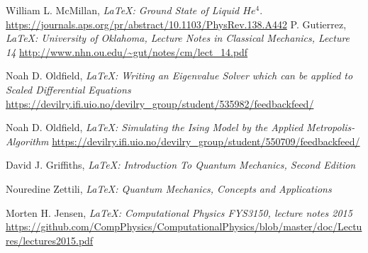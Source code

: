 \documentclass[aip,nobalancelastpage,
twocolumn,
rsi,%
 amsmath,amssymb,
 reprint,%
]{revtex4}
\begin{document}
\begin{thebibliography}{9}

  William L. McMillan,
  \emph{\LaTeX: Ground State of Liquid $He^4$}.
  \url{https://journals.aps.org/pr/abstract/10.1103/PhysRev.138.A442}
	P. Gutierrez,
	\emph{\LaTeX: University of Oklahoma, Lecture Notes in Classical Mechanics, Lecture 14}
	\url{http://www.nhn.ou.edu/~gut/notes/cm/lect_14.pdf}

	Noah D. Oldfield,
	\emph{\LaTeX: Writing an Eigenvalue Solver which can be applied to Scaled Differential
Equations}
	\url{https://devilry.ifi.uio.no/devilry_group/student/535982/feedbackfeed/}

	Noah D. Oldfield,
	\emph{\LaTeX: Simulating the Ising Model by the Applied Metropolis-Algorithm}
	\url{https://devilry.ifi.uio.no/devilry_group/student/550709/feedbackfeed/}

	David J. Griffiths,
	\emph{\LaTeX: Introduction To Quantum Mechanics, Second Edition}

	Nouredine Zettili,
	\emph{\LaTeX: Quantum Mechanics, Concepts and Applications}

	Morten H. Jensen,
	\emph{\LaTeX: Computational Physics FYS3150, lecture notes 2015}
	\url{https://github.com/CompPhysics/ComputationalPhysics/blob/master/doc/Lectures/lectures2015.pdf}

\end{thebibliography}
	
\end{document}
